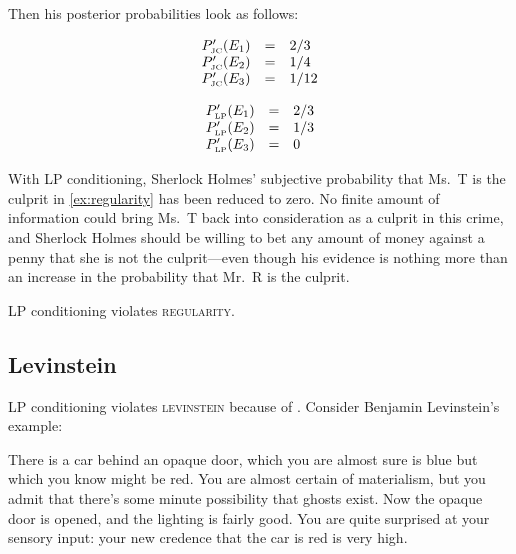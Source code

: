 \documentclass[12pt]{article}
\begin{document}
Then his posterior probabilities look as follows:

\begin{equation}
  \label{eq:sherlockposteriorjcreg}
  \begin{array}{rcl}
  P'_{\mbox{\tiny JC}}(E_{1})&=&2/3\\
  P'_{\mbox{\tiny JC}}(E_{2})&=&1/4\\
  P'_{\mbox{\tiny JC}}(E_{3})&=&1/12
\end{array}
\end{equation}

\begin{equation}
  \label{eq:sherlockposteriorlpreg}
  \begin{array}{rcl}
  P'_{\mbox{\tiny LP}}(E_{1})&=&2/3\\
  P'_{\mbox{\tiny LP}}(E_{2})&=&1/3\\
  P'_{\mbox{\tiny LP}}(E_{3})&=&0
\end{array}
\end{equation}

With LP conditioning, Sherlock Holmes' subjective probability that
Ms.\ T is the culprit in {\xample} \ref{ex:regularity} has been reduced
to zero. No finite amount of information could bring Ms.\ T back into
consideration as a culprit in this crime, and Sherlock Holmes should
be willing to bet any amount of money against a penny that she is not
the culprit---even though his evidence is nothing more than an
increase in the probability that Mr.\ R is the culprit.

LP conditioning violates \textsc{regularity}.

\subsection{Levinstein}
\label{Levinstein}

LP conditioning violates \textsc{levinstein} because of 
. Consider Benjamin Levinstein's example:

\begin{quotex}
  \label{ex:levinstein} There is a car
  behind an opaque door, which you are almost sure is blue but which
  you know might be red. You are almost certain of materialism, but
  you admit that there's some minute possibility that ghosts exist.
  Now the opaque door is opened, and the lighting is fairly good. You
  are quite surprised at your sensory input: your new credence that
  the car is red is very high.
\end{quotex}
\end{document}
